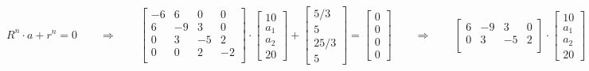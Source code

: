 $R^n\cdot a +r^n=0 \qquad\Rightarrow\qquad
\begin{bmatrix}
	-6 & 6 & 0 & 0\\
	6 & -9 & 3 & 0\\
	0 & 3 & -5 & 2\\
	0 & 0 & 2 & -2\\
\end{bmatrix}\cdot
\begin{bmatrix}
	10\\
	a_1\\
	a_2\\
	20
\end{bmatrix}+
\begin{bmatrix}
	5/3\\
	5\\
	25/3\\
	5
\end{bmatrix}=
\begin{bmatrix}
	0\\
	0\\
	0\\
	0
\end{bmatrix}\qquad\Rightarrow\qquad
\begin{bmatrix}
	6 & -9 & 3 & 0\\
	0 & 3 & -5 & 2\\
\end{bmatrix}\cdot
\begin{bmatrix}
	10\\
	a_1\\
	a_2\\
	20
\end{bmatrix}+
\begin{bmatrix}
	5/3\\
	5\\
	25/3\\
	5
\end{bmatrix}=
\begin{bmatrix}
	0\\
	0\\
	0\\
	0
\end{bmatrix}	
$\\
\\

